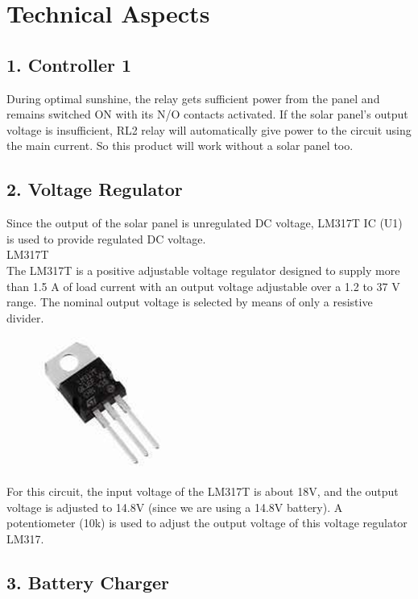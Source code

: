\documentclass[twocolumn]{article}
\begin{document}
\section*{Technical Aspects}
\subsection*{1. Controller 1}
During optimal sunshine, the relay gets sufficient power from the panel and remains switched ON with its N/O contacts activated. If the solar panel's output voltage is insufficient, RL2 relay will automatically give power to the circuit using the main current. So this product will work without a solar panel too.

\subsection*{2. Voltage Regulator}
Since the output of the solar panel is unregulated DC voltage, LM317T IC (U1) is used to provide regulated DC voltage. \\

\noindent LM317T \\


\noindent The LM317T is a positive adjustable voltage regulator designed to supply more than 1.5 A of load current with an output voltage adjustable over a 1.2 to 37 V range. The nominal output voltage is selected by means of only a resistive divider. 

\begin{figure}[h]
    \centering
    \includegraphics{7.png}
    \label{fig:enter-label}
\end{figure}

\noindent For this circuit, the input voltage of the LM317T is about 18V, and the output voltage is adjusted to 14.8V (since we are using a 14.8V battery). A potentiometer (10k) is used to adjust the output voltage of this voltage regulator LM317.

\subsection*{3. Battery Charger}
\end{document}
